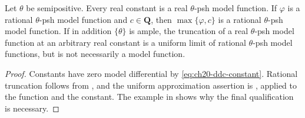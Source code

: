 \begin{corollary}
\label{cor:ch20-truncation}
Let \(\theta\) be semipositive.  Every real constant is a real
\(\theta\)-psh model function.  If \(\varphi\) is a rational
\(\theta\)-psh model function and \(c\in\mathbf Q\), then
\(\max\{\varphi,c\}\) is a rational \(\theta\)-psh model function.
If in addition \(\{\theta\}\) is ample, the truncation of a real
\(\theta\)-psh model function at an arbitrary real constant is a uniform
limit of rational \(\theta\)-psh model functions, but is not necessarily
a model function.
\end{corollary}

\begin{proof}
Constants have zero model differential by
\eqref{eq:ch20-ddc-constant}.  Rational truncation follows from
, and the uniform approximation assertion is
, applied to the function
and the constant.  The example in
 shows why the final
qualification is necessary.
\end{proof}
